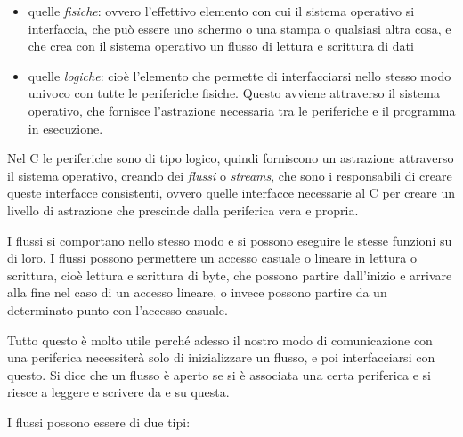 \documentclass[
]{article}
\begin{document}
\begin{itemize}
\item
  quelle \emph{fisiche}: ovvero l'effettivo elemento con cui il sistema
  operativo si interfaccia, che può essere uno schermo o una stampa o
  qualsiasi altra cosa, e che crea con il sistema operativo un flusso di
  lettura e scrittura di dati
\item
  quelle \emph{logiche}: cioè l'elemento che permette di interfacciarsi
  nello stesso modo univoco con tutte le periferiche fisiche. Questo
  avviene attraverso il sistema operativo, che fornisce l'astrazione
  necessaria tra le periferiche e il programma in esecuzione.
\end{itemize}

Nel C le periferiche sono di tipo logico, quindi forniscono un
astrazione attraverso il sistema operativo, creando dei \emph{flussi} o
\emph{streams}, che sono i responsabili di creare queste interfacce
consistenti, ovvero quelle interfacce necessarie al C per creare un
livello di astrazione che prescinde dalla periferica vera e propria.

I flussi si comportano nello stesso modo e si possono eseguire le stesse
funzioni su di loro. I flussi possono permettere un accesso casuale o
lineare in lettura o scrittura, cioè lettura e scrittura di byte, che
possono partire dall'inizio e arrivare alla fine nel caso di un accesso
lineare, o invece possono partire da un determinato punto con l'accesso
casuale.

Tutto questo è molto utile perché adesso il nostro modo di comunicazione
con una periferica necessiterà solo di inizializzare un flusso, e poi
interfacciarsi con questo. Si dice che un flusso è aperto se si è
associata una certa periferica e si riesce a leggere e scrivere da e su
questa.

I flussi possono essere di due tipi:
\end{document}
